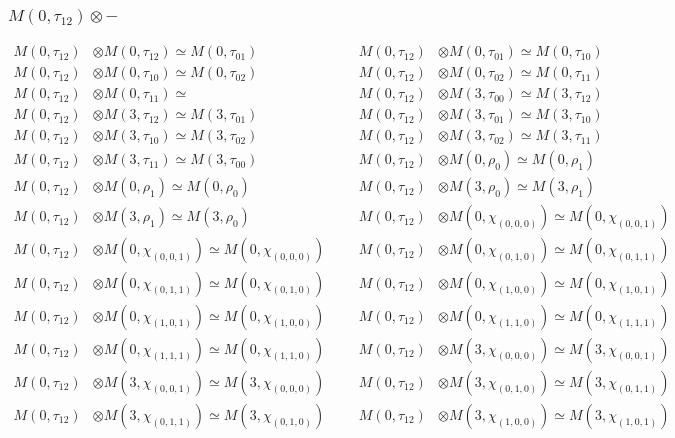 \subsubsection{$ M(0,\tau_{12})\otimes -$}
\begin{align*}
M(0,\tau_{12}) &\otimes M(0,\tau_{12}) \simeq M(0,\tau_{01}) &&& M(0,\tau_{12}) &\otimes M(0,\tau_{01}) \simeq M(0,\tau_{10})\\
M(0,\tau_{12}) &\otimes M(0,\tau_{10}) \simeq M(0,\tau_{02}) &&& M(0,\tau_{12}) &\otimes M(0,\tau_{02}) \simeq M(0,\tau_{11})\\
M(0,\tau_{12}) &\otimes M(0,\tau_{11}) \simeq  &&& M(0,\tau_{12}) &\otimes M(3,\tau_{00}) \simeq M(3,\tau_{12})\\
M(0,\tau_{12}) &\otimes M(3,\tau_{12}) \simeq M(3,\tau_{01}) &&& M(0,\tau_{12}) &\otimes M(3,\tau_{01}) \simeq M(3,\tau_{10})\\
M(0,\tau_{12}) &\otimes M(3,\tau_{10}) \simeq M(3,\tau_{02}) &&& M(0,\tau_{12}) &\otimes M(3,\tau_{02}) \simeq M(3,\tau_{11})\\
M(0,\tau_{12}) &\otimes M(3,\tau_{11}) \simeq M(3,\tau_{00}) &&& M(0,\tau_{12}) &\otimes M(0,\rho_{0}) \simeq M(0,\rho_{1})\\
M(0,\tau_{12}) &\otimes M(0,\rho_{1}) \simeq M(0,\rho_{0}) &&& M(0,\tau_{12}) &\otimes M(3,\rho_{0}) \simeq M(3,\rho_{1})\\
M(0,\tau_{12}) &\otimes M(3,\rho_{1}) \simeq M(3,\rho_{0}) &&& M(0,\tau_{12}) &\otimes M(0,\chi_{(0,0,0)}) \simeq M(0,\chi_{(0,0,1)})\\
M(0,\tau_{12}) &\otimes M(0,\chi_{(0,0,1)}) \simeq M(0,\chi_{(0,0,0)}) &&& M(0,\tau_{12}) &\otimes M(0,\chi_{(0,1,0)}) \simeq M(0,\chi_{(0,1,1)})\\
M(0,\tau_{12}) &\otimes M(0,\chi_{(0,1,1)}) \simeq M(0,\chi_{(0,1,0)}) &&& M(0,\tau_{12}) &\otimes M(0,\chi_{(1,0,0)}) \simeq M(0,\chi_{(1,0,1)})\\
M(0,\tau_{12}) &\otimes M(0,\chi_{(1,0,1)}) \simeq M(0,\chi_{(1,0,0)}) &&& M(0,\tau_{12}) &\otimes M(0,\chi_{(1,1,0)}) \simeq M(0,\chi_{(1,1,1)})\\
M(0,\tau_{12}) &\otimes M(0,\chi_{(1,1,1)}) \simeq M(0,\chi_{(1,1,0)}) &&& M(0,\tau_{12}) &\otimes M(3,\chi_{(0,0,0)}) \simeq M(3,\chi_{(0,0,1)})\\
M(0,\tau_{12}) &\otimes M(3,\chi_{(0,0,1)}) \simeq M(3,\chi_{(0,0,0)}) &&& M(0,\tau_{12}) &\otimes M(3,\chi_{(0,1,0)}) \simeq M(3,\chi_{(0,1,1)})\\
M(0,\tau_{12}) &\otimes M(3,\chi_{(0,1,1)}) \simeq M(3,\chi_{(0,1,0)}) &&& M(0,\tau_{12}) &\otimes M(3,\chi_{(1,0,0)}) \simeq M(3,\chi_{(1,0,1)})\\

\end{align*}
